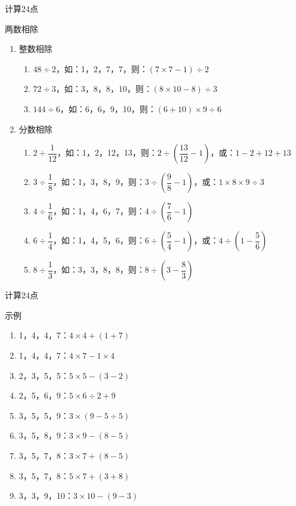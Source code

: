 \documentclass[aspectratio=169]{ctexbeamer} %
\begin{document}
\begin{frame}[t]{计算24点}
\begin{spacing}{1.1}
\normalsize
\alert{两数相除}
\begin{enumerate}[label={\arabic*.}]
\item 整数相除
	\begin{enumerate}[label={\Alph*.}]
	\item $48 \div 2$，如：1，2，7，7，则：$(7 \times 7 - 1) \div 2$
	\item $72 \div 3$，如：3，8，8，10，则：$(8 \times 10 - 8) \div 3$
	\item  $144 \div 6$，如：6，6，9，10，则：$(6 + 10) \times 9 \div 6$
	\end{enumerate}
\item 分数相除
	\begin{enumerate}[label={\Alph*.}]
	\item $2 \div \dfrac{1}{12}$，如：1，2，12，13，则：$2 \div (\dfrac{13}{12} - 1)$，或：$1 - 2 + 12 + 13$
	\item $3 \div \dfrac{1}{8}$，如：1，3，8，9，则：$3 \div (\dfrac{9}{8} - 1)$，或：$1 \times 8 \times 9 \div 3$
	\item $4 \div \dfrac{1}{6}$，如：1，4，6，7，则：$4 \div (\dfrac{7}{6} - 1)$	
	\item $6 \div \dfrac{1}{4}$，如：1，4，5，6，则：$6 \div (\dfrac{5}{4} - 1)$，或：$4 \div (1 - \dfrac{5}{6})$
	\item $8 \div \dfrac{1}{3}$，如：3，3，8，8，则：$8 \div (3 - \dfrac{8}{3})$	
	\end{enumerate}
\end{enumerate}
\end{spacing}
\end{frame}

\begin{frame}[t]{计算24点}
\begin{spacing}{1.2}
\normalsize
\alert{示例}
\begin{enumerate}[label={\arabic*.}]
\item 1，4，4，7：\pause $4 \times 4 + (1+ 7)$
\item 1，4，4，7：\pause $4 \times 7 - 1 \times 4$
\item 2，3，5，5：\pause $5 \times 5 - (3 - 2)$
\item 2，5，6，9：\pause $5 \times 6 \div 2 + 9$
\item 3，5，5，9：\pause $3 \times (9 - 5 \div 5)$
\item 3，5，8，9：\pause $3 \times 9 - (8 - 5)$
\item 3，5，7，8：\pause $3 \times 7 + (8 - 5)$
\item 3，5，7，8：\pause $5 \times 7 + (3 + 8)$
\item 3，3，9，10：\pause $3 \times 10 - (9 - 3)$
\end{enumerate}
\end{spacing}
\end{frame}
\end{document}
